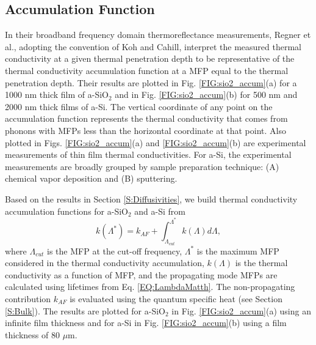 \documentclass[aps,prb,onecolumn,preprint,superscriptaddress,footinbib,amsmath,amssymb,floatfix]{revtex4}
\begin{document}
\subsection{\label{S:Accumulation}Accumulation Function}

In their broadband frequency domain thermoreflectance 
measurements, Regner et al.,\cite{regner_broadband_2013}  
adopting the convention of Koh and Cahill,\cite{koh_frequency_2007} 
interpret the  
measured thermal conductivity at a given thermal penetration depth 
to be representative of the thermal conductivity accumulation 
function at a MFP equal to the thermal penetration depth.
\cite{dames_thermal_2005,yang_mean_2013} 
Their results are plotted in Fig. \ref{FIG:sio2_accum}(a) 
for a 1000 nm thick film of a-SiO$_2$ 
and in Fig. \ref{FIG:sio2_accum}(b) for 500 nm and 
2000 nm thick films of a-Si. The vertical coordinate 
of any point on the accumulation function represents the thermal 
conductivity that comes from phonons with MFPs less than the 
horizontal coordinate at that point. Also plotted in 
Figs. \ref{FIG:sio2_accum}(a) and \ref{FIG:sio2_accum}(b) 
are experimental measurements of thin film thermal 
conductivities. For a-Si, the experimental measurements are 
broadly grouped by sample preparation technique: 
(A) chemical vapor deposition
\cite{moon_thermal_2002,liu_high_2009,yang_anomalously_2010}
and (B) sputtering.
\cite{kuo_thermal_1992,cahill_thermal_1994,wada_thermal_1996} 

Based on the results in Section \ref{S:Diffusivities}, we build 
thermal conductivity accumulation functions for a-SiO$_2$ and a-Si 
from
\begin{equation}\label{EQ:kLambda}
k(\Lambda^{*}) = k_{AF} + 
\int^{\Lambda^{*}}_{\Lambda_{cut}} 
k(\Lambda)d\Lambda,
\end{equation}
where $\Lambda_{cut}$ is the MFP at the cut-off frequency, 
$\Lambda^*$ is the maximum MFP considered in the thermal 
conductivity accumulation, $k(\Lambda)$ is the thermal conductivity 
as a function of MFP,\cite{yang_mean_2013} 
and the propagating mode MFPs are 
calculated using lifetimes from Eq. \eqref{EQ:LambdaMatth}. The 
non-propagating contribution $k_{AF}$ is evaluated using the quantum 
specific heat (see Section \ref{S:Bulk}). 
The results are plotted for a-SiO$_2$ 
in Fig. \ref{FIG:sio2_accum}(a) using an infinite film thickness 
and for a-Si in Fig. \ref{FIG:sio2_accum}(b) using a film 
thickness of $80$ $\mu$m.\cite{mfp_fn3}  
\end{document}
